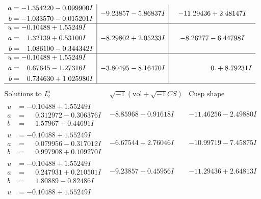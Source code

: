 \documentclass[1p]{elsarticle_modified}
\theoremstyle{definition}
\newcommand{\I}{\sqrt{-1}}
\begin{document}
$$\begin{array}{c|c|c}
\begin{aligned}
a &= -1.354220 - 0.099900 I \\
b &= -1.033570 - 0.015201 I\end{aligned}
 & -9.23857 - 5.86837 I & -11.29436 + 2.48147 I \\ \hline\begin{aligned}
u &= -0.10488 + 1.55249 I \\
a &= \phantom{-}1.32139 + 0.53100 I \\
b &= \phantom{-}1.086100 - 0.344342 I\end{aligned}
 & -8.29802 + 2.05233 I & -8.26277 - 6.44798 I \\ \hline\begin{aligned}
u &= -0.10488 + 1.55249 I \\
a &= \phantom{-}0.67645 - 1.27316 I \\
b &= \phantom{-}0.734630 + 1.025980 I\end{aligned}
 & -3.80495 - 8.16470 I & \phantom{-0.000000 -}0. + 8.79231 I\\
 \hline 
 \end{array}$$\newpage$$\begin{array}{c|c|c}  
\text{Solutions to }I^u_{2}& \I (\text{vol} + \sqrt{-1}CS) & \text{Cusp shape}\\
 \hline 
\begin{aligned}
u &= -0.10488 + 1.55249 I \\
a &= \phantom{-}0.312972 - 0.306376 I \\
b &= \phantom{-}1.57967 + 0.44691 I\end{aligned}
 & -8.85968 - 0.91618 I & -11.46256 - 2.49880 I \\ \hline\begin{aligned}
u &= -0.10488 + 1.55249 I \\
a &= \phantom{-}0.079956 - 0.317012 I \\
b &= \phantom{-}0.997908 + 0.109270 I\end{aligned}
 & -6.67544 + 2.76046 I & -10.99719 - 7.45875 I \\ \hline\begin{aligned}
u &= -0.10488 + 1.55249 I \\
a &= \phantom{-}0.247931 + 0.210501 I \\
b &= \phantom{-}1.80889 - 0.82486 I\end{aligned}
 & -9.23857 - 0.45956 I & -11.29436 + 2.64813 I \\ \hline\begin{aligned}
u &= -0.10488 + 1.55249 I \\

\end{aligned}
\end{array}$$
\end{document}
